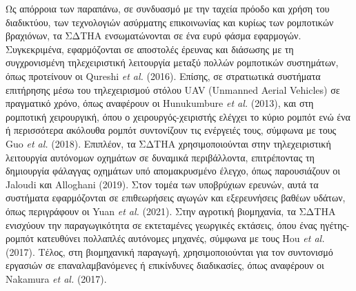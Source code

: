 \bigskip
Ως απόρροια των παραπάνω, σε συνδυασμό με την ταχεία πρόοδο και χρήση του διαδικτύου, των τεχνολογιών ασύρματης επικοινωνίας και κυρίως των ρομποτικών βραχιόνων, τα ΣΔΤΗΑ ενσωματώνονται σε ένα ευρύ φάσμα εφαρμογών. Συγκεκριμένα, εφαρμόζονται σε αποστολές έρευνας και διάσωσης με τη συγχρονισμένη τηλεχειριστική λειτουργία μεταξύ πολλών ρομποτικών συστημάτων, όπως προτείνουν οι Qureshi \textit{et al.} (2016)\cite{qureshi2016leader}. Επίσης, σε στρατιωτικά συστήματα επιτήρησης μέσω του τηλεχειρισμού στόλου UAV (Unmanned Aerial Vehicles) σε πραγματικό χρόνο, όπως αναφέρουν οι Hunukumbure \textit{et al.} (2013)\cite{hunukumbure2013teleoperation}, και στη ρομποτική χειρουργική, όπου ο χειρουργός-χειριστής ελέγχει το κύριο ρομπότ ενώ ένα ή περισσότερα ακόλουθα ρομπότ συντονίζουν τις ενέργειές τους, σύμφωνα με τους Guo \textit{et al.} (2018)\cite{guo2018leader}. Επιπλέον, τα ΣΔΤΗΑ χρησιμοποιούνται στην τηλεχειριστική λειτουργία αυτόνομων οχημάτων σε δυναμικά περιβάλλοντα, επιτρέποντας τη δημιουργία φάλαγγας οχημάτων υπό απομακρυσμένο έλεγχο, όπως παρουσιάζουν οι Jaloudi και Alloghani (2019)\cite{jaloudi2019leader}. Στον τομέα των υποβρύχιων ερευνών, αυτά τα συστήματα εφαρμόζονται σε επιθεωρήσεις αγωγών και εξερευνήσεις βαθέων υδάτων, όπως περιγράφουν οι Yuan \textit{et al.} (2021)\cite{yuan2021leader}. Στην αγροτική βιομηχανία, τα ΣΔΤΗΑ ενισχύουν την παραγωγικότητα σε εκτεταμένες γεωργικές εκτάσεις, όπου ένας ηγέτης-ρομπότ κατευθύνει πολλαπλές αυτόνομες μηχανές, σύμφωνα με τους Hou \textit{et al.} (2017)\cite{hou2017leader}. Τέλος, στη βιομηχανική παραγωγή, χρησιμοποιούνται για τον συντονισμό εργασιών σε επαναλαμβανόμενες ή επικίνδυνες διαδικασίες, όπως αναφέρουν οι Nakamura \textit{et al.} (2017)\cite{nakamura2017leader}.

